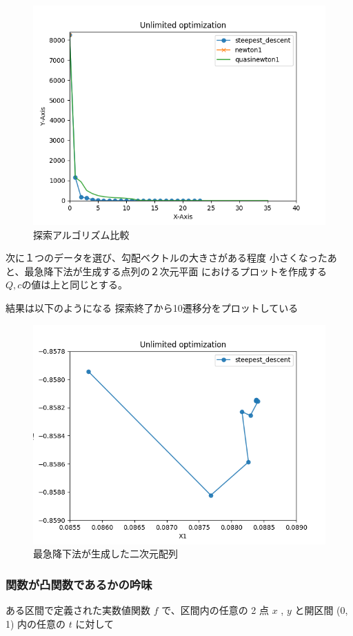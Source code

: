 \documentclass{jsarticle}
\begin{document}
\begin{figure}[H]
  \centering
  \includegraphics[width=12cm]{./graph1.png}
  \caption{探索アルゴリズム比較}
\end{figure}

次に１つのデータを選び、勾配ベクトルの大きさがある程度
小さくなったあと、最急降下法が生成する点列の２次元平面
におけるプロットを作成する\\

$Q,c$の値は上と同じとする。

結果は以下のようになる
探索終了から10遷移分をプロットしている


\begin{figure}[H]
  \centering
  \includegraphics[width=12cm]{./graph3.png}
  \caption{最急降下法が生成した二次元配列}
\end{figure}

\subsubsection{関数が凸関数であるかの吟味}
ある区間で定義された実数値関数 $f$ で、区間内の任意の 2 点 $x$ , $y$ と開区間 (0, 1) 内の任意の $t$ に対して
\end{document}
